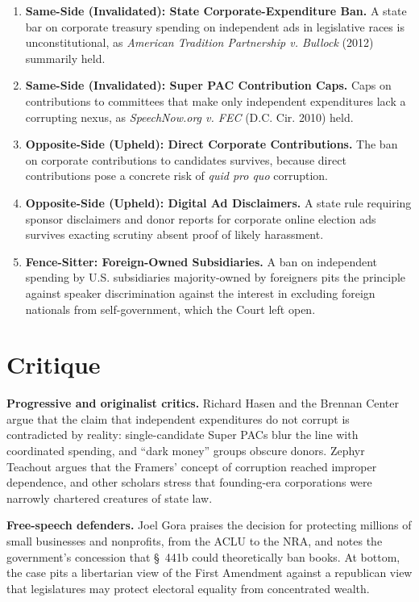 \documentclass[12pt]{article}
\begin{document}
\begin{enumerate}
\item \textbf{Same-Side (Invalidated): State Corporate-Expenditure Ban.} A state bar on corporate treasury spending on independent ads in legislative races is unconstitutional, as \textit{American Tradition Partnership v. Bullock} (2012) summarily held.
\item \textbf{Same-Side (Invalidated): Super PAC Contribution Caps.} Caps on contributions to committees that make only independent expenditures lack a corrupting nexus, as \textit{SpeechNow.org v. FEC} (D.C. Cir. 2010) held.
\item \textbf{Opposite-Side (Upheld): Direct Corporate Contributions.} The ban on corporate contributions to candidates survives, because direct contributions pose a concrete risk of \textit{quid pro quo} corruption.
\item \textbf{Opposite-Side (Upheld): Digital Ad Disclaimers.} A state rule requiring sponsor disclaimers and donor reports for corporate online election ads survives exacting scrutiny absent proof of likely harassment.
\item \textbf{Fence-Sitter: Foreign-Owned Subsidiaries.} A ban on independent spending by U.S. subsidiaries majority-owned by foreigners pits the principle against speaker discrimination against the interest in excluding foreign nationals from self-government, which the Court left open.
\end{enumerate}

\section{Critique}

\textbf{Progressive and originalist critics.} Richard Hasen and the Brennan Center argue that the claim that independent expenditures do not corrupt is contradicted by reality: single-candidate Super PACs blur the line with coordinated spending, and ``dark money'' groups obscure donors. Zephyr Teachout argues that the Framers' concept of corruption reached improper dependence, and other scholars stress that founding-era corporations were narrowly chartered creatures of state law.

\textbf{Free-speech defenders.} Joel Gora praises the decision for protecting millions of small businesses and nonprofits, from the ACLU to the NRA, and notes the government's concession that \S~441b could theoretically ban books. At bottom, the case pits a libertarian view of the First Amendment against a republican view that legislatures may protect electoral equality from concentrated wealth.
\end{document}
